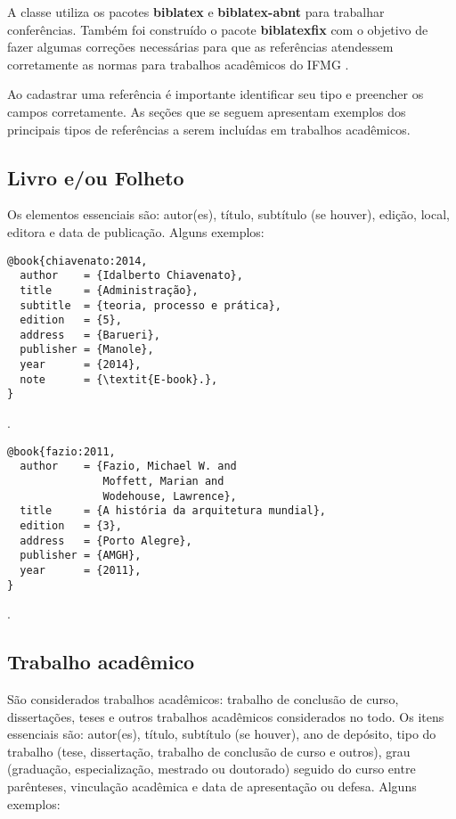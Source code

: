 A classe {\iftex} utiliza os pacotes \textbf{biblatex} e \textbf{biblatex-abnt} para trabalhar conferências.
Também foi construído o pacote \textbf{biblatexfix} com o objetivo de fazer algumas correções necessárias para que as referências atendessem corretamente as normas para trabalhos acadêmicos do IFMG \cite{ifmg:2020:manual}.

Ao cadastrar uma referência é importante identificar seu tipo e preencher os campos corretamente.
As seções que se seguem apresentam exemplos dos principais tipos de referências a serem incluídas em trabalhos acadêmicos.

\subsection{Livro e/ou Folheto}

Os elementos essenciais são: autor(es), título, subtítulo (se houver), edição, local, editora e data de publicação.
Alguns exemplos:

\vspace*{1em}

\begin{verbatim}
@book{chiavenato:2014,
  author    = {Idalberto Chiavenato},
  title     = {Administração},
  subtitle  = {teoria, processo e prática},
  edition   = {5},
  address   = {Barueri},
  publisher = {Manole},
  year      = {2014},
  note      = {\textit{E-book}.},
}
\end{verbatim}

\noindent
{}.

\vspace*{1em}

\begin{verbatim}
@book{fazio:2011,
  author    = {Fazio, Michael W. and
               Moffett, Marian and
               Wodehouse, Lawrence},
  title     = {A história da arquitetura mundial},
  edition   = {3},
  address   = {Porto Alegre},
  publisher = {AMGH},
  year      = {2011},
}
\end{verbatim}

\noindent
{}.

\subsection{Trabalho acadêmico}

São considerados trabalhos acadêmicos: trabalho de conclusão de curso, dissertações, teses e outros trabalhos acadêmicos considerados no todo.
Os itens essenciais são: autor(es), título, subtítulo (se houver), ano de depósito, tipo do trabalho (tese, dissertação, trabalho de conclusão de curso e outros), grau (graduação, especialização, mestrado ou doutorado) seguido do curso entre parênteses, vinculação acadêmica e data de apresentação ou defesa.
Alguns exemplos:

